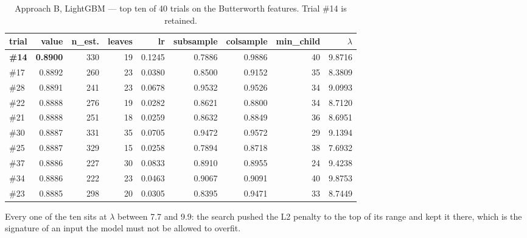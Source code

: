 \begin{table}[H]
\centering
\caption{Approach B, LightGBM --- top ten of 40 trials on the Butterworth
features. Trial \#14 is retained.}
\label{tab:app:optBlgbm}
\scriptsize
\begin{tabular}{@{}lrrrrrrrr@{}}
\toprule
\textbf{trial} & \textbf{value} & \textbf{n\_est.} & \textbf{leaves} &
\textbf{lr} & \textbf{subsample} & \textbf{colsample} & \textbf{min\_child} &
\textbf{$\lambda$} \\
\midrule
\textbf{\#14} & \textbf{0.8900} & 330 & 19 & 0.1245 & 0.7886 & 0.9886 & 40 & 9.8716 \\
\#17 & 0.8892 & 260 & 23 & 0.0380 & 0.8500 & 0.9152 & 35 & 8.3809 \\
\#28 & 0.8891 & 241 & 23 & 0.0678 & 0.9532 & 0.9526 & 34 & 9.0993 \\
\#22 & 0.8888 & 276 & 19 & 0.0282 & 0.8621 & 0.8800 & 34 & 8.7120 \\
\#21 & 0.8888 & 251 & 18 & 0.0259 & 0.8632 & 0.8849 & 36 & 8.6951 \\
\#30 & 0.8887 & 331 & 35 & 0.0705 & 0.9472 & 0.9572 & 29 & 9.1394 \\
\#25 & 0.8887 & 329 & 15 & 0.0258 & 0.7894 & 0.8718 & 38 & 7.6932 \\
\#37 & 0.8886 & 227 & 30 & 0.0833 & 0.8910 & 0.8955 & 24 & 9.4238 \\
\#34 & 0.8886 & 222 & 23 & 0.0463 & 0.9067 & 0.9091 & 40 & 9.8753 \\
\#23 & 0.8885 & 298 & 20 & 0.0305 & 0.8395 & 0.9471 & 33 & 8.7449 \\
\bottomrule
\end{tabular}
\end{table}

Every one of the ten sits at $\lambda$ between \num{7.7} and \num{9.9}: the
search pushed the L2 penalty to the top of its range and kept it there, which is
the signature of an input the model must not be allowed to overfit.

